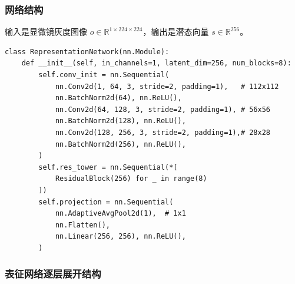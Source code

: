 \documentclass[UTF8, a4paper]{ctexart}
\begin{document}
\subsubsection{网络结构}

输入是显微镜灰度图像 $o \in \mathbb{R}^{1 \times 224 \times 224}$，输出是潜态向量 $s \in \mathbb{R}^{256}$。

\begin{lstlisting}
class RepresentationNetwork(nn.Module):
    def __init__(self, in_channels=1, latent_dim=256, num_blocks=8):
        self.conv_init = nn.Sequential(
            nn.Conv2d(1, 64, 3, stride=2, padding=1),   # 112x112
            nn.BatchNorm2d(64), nn.ReLU(),
            nn.Conv2d(64, 128, 3, stride=2, padding=1), # 56x56
            nn.BatchNorm2d(128), nn.ReLU(),
            nn.Conv2d(128, 256, 3, stride=2, padding=1),# 28x28
            nn.BatchNorm2d(256), nn.ReLU(),
        )
        self.res_tower = nn.Sequential(*[
            ResidualBlock(256) for _ in range(8)
        ])
        self.projection = nn.Sequential(
            nn.AdaptiveAvgPool2d(1),  # 1x1
            nn.Flatten(),
            nn.Linear(256, 256), nn.ReLU(),
        )
\end{lstlisting}

\subsubsection{表征网络逐层展开结构}
\end{document}
